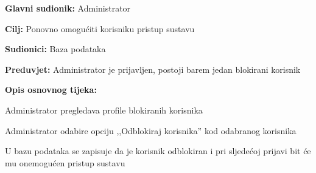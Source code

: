 						\noindent {}
						\begin{packed_item}
							
							\item \textbf{Glavni sudionik: }Administrator
							\item  \textbf{Cilj: }Ponovno omogućiti korisniku pristup sustavu
							\item  \textbf{Sudionici: }Baza podataka
							\item  \textbf{Preduvjet: }Administrator je prijavljen, postoji barem jedan blokirani korisnik
							\item  \textbf{Opis osnovnog tijeka:}
							
							\item[] \begin{packed_enum}
								
								\item Administrator pregledava profile blokiranih korisnika
								\item Administrator odabire opciju ,,Odblokiraj korisnika” kod odabranog korisnika
								\item U bazu podataka se zapisuje da je korisnik odblokiran i pri sljedećoj prijavi bit će mu onemogućen pristup sustavu 
							\end{packed_enum}
							
						\end{packed_item}
						\noindent {}
